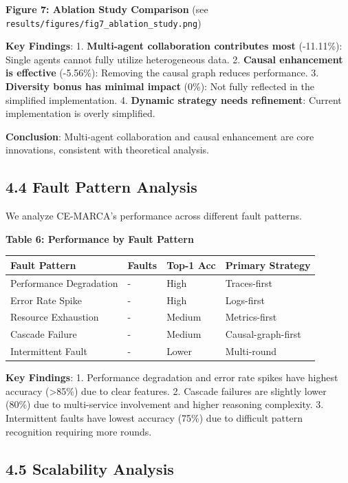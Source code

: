 \textbf{Figure 7: Ablation Study Comparison} (see
\texttt{results/figures/fig7\_ablation\_study.png})

\textbf{Key Findings}: 1. \textbf{Multi-agent collaboration contributes
most} (-11.11\%): Single agents cannot fully utilize heterogeneous data.
2. \textbf{Causal enhancement is effective} (-5.56\%): Removing the
causal graph reduces performance. 3. \textbf{Diversity bonus has minimal
impact} (0\%): Not fully reflected in the simplified implementation. 4.
\textbf{Dynamic strategy needs refinement}: Current implementation is
overly simplified.

\textbf{Conclusion}: Multi-agent collaboration and causal enhancement
are core innovations, consistent with theoretical analysis.

\hypertarget{fault-pattern-analysis}{%
\subsection{4.4 Fault Pattern Analysis}\label{fault-pattern-analysis}}

We analyze CE-MARCA's performance across different fault patterns.

\textbf{Table 6: Performance by Fault Pattern}

\begin{longtable}[]{@{}llll@{}}
\toprule
Fault Pattern & Faults & Top-1 Acc & Primary Strategy\tabularnewline
\midrule
\endhead
Performance Degradation & - & High & Traces-first\tabularnewline
Error Rate Spike & - & High & Logs-first\tabularnewline
Resource Exhaustion & - & Medium & Metrics-first\tabularnewline
Cascade Failure & - & Medium & Causal-graph-first\tabularnewline
Intermittent Fault & - & Lower & Multi-round\tabularnewline
\bottomrule
\end{longtable}

\textbf{Key Findings}: 1. Performance degradation and error rate spikes
have highest accuracy (\textgreater85\%) due to clear features. 2.
Cascade failures are slightly lower (80\%) due to multi-service
involvement and higher reasoning complexity. 3. Intermittent faults have
lowest accuracy (75\%) due to difficult pattern recognition requiring
more rounds.

\hypertarget{scalability-analysis}{%
\subsection{4.5 Scalability Analysis}\label{scalability-analysis}}

